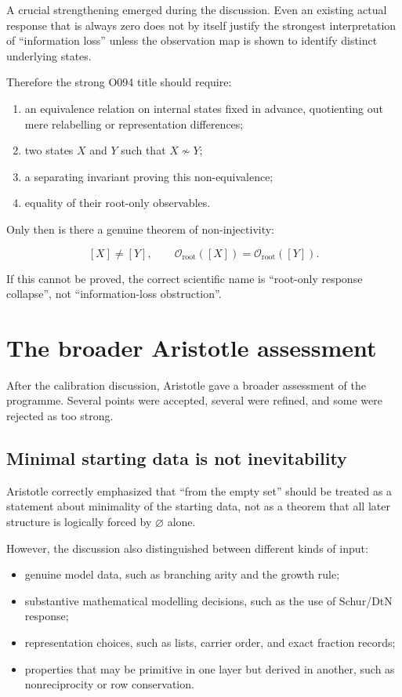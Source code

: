 \documentclass[11pt,a4paper]{article}
\begin{document}
A crucial strengthening emerged during the discussion. Even an existing actual response that is always zero does not by itself justify the strongest interpretation of ``information loss'' unless the observation map is shown to identify distinct underlying states.

Therefore the strong O094 title should require:

\begin{enumerate}
  \item an equivalence relation on internal states fixed in advance, quotienting out mere relabelling or representation differences;
  \item two states $X$ and $Y$ such that $X\not\sim Y$;
  \item a separating invariant proving this non-equivalence;
  \item equality of their root-only observables.
\end{enumerate}

Only then is there a genuine theorem of non-injectivity:

\[
[X]\neq[Y],
\qquad
\mathcal O_{\mathrm{root}}([X])
=
\mathcal O_{\mathrm{root}}([Y]).
\]

If this cannot be proved, the correct scientific name is ``root-only response collapse'', not ``information-loss obstruction''.

\section{The broader Aristotle assessment}

After the calibration discussion, Aristotle gave a broader assessment of the programme. Several points were accepted, several were refined, and some were rejected as too strong.

\subsection{Minimal starting data is not inevitability}

Aristotle correctly emphasized that ``from the empty set'' should be treated as a statement about minimality of the starting data, not as a theorem that all later structure is logically forced by $\varnothing$ alone.

However, the discussion also distinguished between different kinds of input:

\begin{itemize}
  \item genuine model data, such as branching arity and the growth rule;
  \item substantive mathematical modelling decisions, such as the use of Schur/DtN response;
  \item representation choices, such as lists, carrier order, and exact fraction records;
  \item properties that may be primitive in one layer but derived in another, such as nonreciprocity or row conservation.
\end{itemize}
\end{document}
